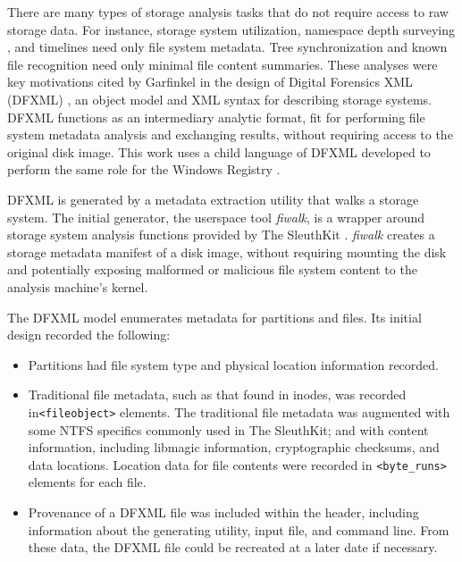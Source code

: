 \documentclass[11pt]{ucthesis}
\theoremstyle{plain}
\theoremstyle{definition}
\newcommand{\fiwalk}{\emph{fiwalk}\xspace}
\begin{document}
There are many types of storage analysis tasks that do not require access to raw storage data. For instance, storage system utilization, namespace depth surveying \cite{agrawal:fast07,douceur:sigmetrics99,meyer:fast11}, and timelines need only file system metadata.  Tree synchronization \cite{garfinkel:dfrws12a} and known file recognition \cite{farrell:acsac08} need only minimal file content summaries.  These analyses were key motivations cited by Garfinkel in the design of Digital Forensics XML (DFXML) \cite{garfinkel:di12}, an object model and XML syntax for describing storage systems.  DFXML functions as an intermediary analytic format, fit for performing file system metadata analysis and exchanging results, without requiring access to the original disk image.  This work uses a child language of DFXML developed to perform the same role for the Windows Registry \cite{nelson:ifip12}.

DFXML is generated by a metadata extraction utility that walks a storage system.  The initial generator, the userspace tool \fiwalk, is a wrapper around storage system analysis functions provided by The SleuthKit \cite{garfinkel:sadfe09}.  \fiwalk creates a storage metadata manifest of a disk image, without requiring mounting the disk and potentially exposing malformed or malicious file system content to the analysis machine's kernel.

The DFXML model enumerates metadata for partitions and files.  Its initial design recorded the following:

\begin{itemize}
\item Partitions had file system type and physical location information recorded.
\item Traditional file metadata, such as that found in inodes, was recorded in{\newline}\texttt{<fileobject>} elements.  The traditional file metadata was augmented with some NTFS specifics commonly used in The SleuthKit; and with content information, including libmagic information, cryptographic checksums, and data locations.  Location data for file contents were recorded in \texttt{<byte\_runs>} elements for each file.  %
\item Provenance of a DFXML file was included within the header, including information about the generating utility, input file, and command line.  From these data, the DFXML file could be recreated at a later date if necessary.
\end{itemize}
\end{document}
